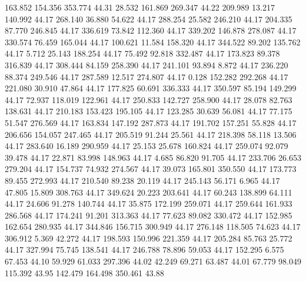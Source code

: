  163.852  154.356  353.774        44.31
  28.532  161.869  269.347        44.22
 209.989   13.217  140.992        44.17
 268.140   36.880   54.622        44.17
 288.254   25.582  246.210        44.17
 204.335   87.770  246.845        44.17
 336.619   73.842  112.360        44.17
 339.202  146.878  278.087        44.17
 330.574   76.459  165.044        44.17
 100.621   11.584  158.320        44.17
 344.522   89.202  135.762        44.17
   5.712   25.143  188.254        44.17
  75.492   92.818  332.487        44.17
 173.823   89.378  316.839        44.17
 308.444   84.159  258.390        44.17
 241.101   93.894    8.872        44.17
 236.220   88.374  249.546        44.17
 287.589   12.517  274.807        44.17
   0.128  152.282  292.268        44.17
 221.080   30.910   47.864        44.17
 177.825   60.691  336.333        44.17
 350.597   85.194  149.299        44.17
  72.937  118.019  122.961        44.17
 250.833  142.727  258.900        44.17
  28.078   82.763  138.631        44.17
 210.183  153.423  195.105        44.17
 123.285   30.639   56.081        44.17
  77.175   51.547  276.569        44.17
 163.834  147.192  287.873        44.17
 191.702  157.251   55.828        44.17
 206.656  154.057  247.465        44.17
 205.519   91.244   25.561        44.17
 218.398   58.118   13.506        44.17
 283.640   16.189  290.959        44.17
  25.153   25.678  160.824        44.17
 259.074   92.079   39.478        44.17
  22.871   83.998  148.963        44.17
   4.685   86.820   91.705        44.17
 233.706   26.653  279.204        44.17
 154.737   74.932  274.567        44.17
  39.073  165.801  350.550        44.17
 173.773   89.455  272.993        44.17
 210.540   89.238   20.119        44.17
 245.143   56.171    6.965        44.17
  47.805   15.809  308.763        44.17
 349.624   20.223  203.641        44.17
  60.243  138.899   64.111        44.17
  24.606   91.278  140.744        44.17
  35.875  172.199  259.071        44.17
 259.644  161.933  286.568        44.17
 174.241   91.201  313.363        44.17
  77.623   89.082  330.472        44.17
 152.985  162.654  280.935        44.17
 344.846  156.715  300.949        44.17
 276.148  118.505   74.623        44.17
 306.912    5.369   42.272        44.17
 198.593  150.996  221.359        44.17
 205.284   85.763   25.772        44.17
 327.994   75.745  138.541        44.17
 246.788   78.896   59.053        44.17
 152.295    6.575   67.453        44.10
  59.929   61.033  297.396        44.02
  42.249   69.271   63.487        44.01
  67.779   98.049  115.392        43.95
 142.479  164.498  350.461        43.88
